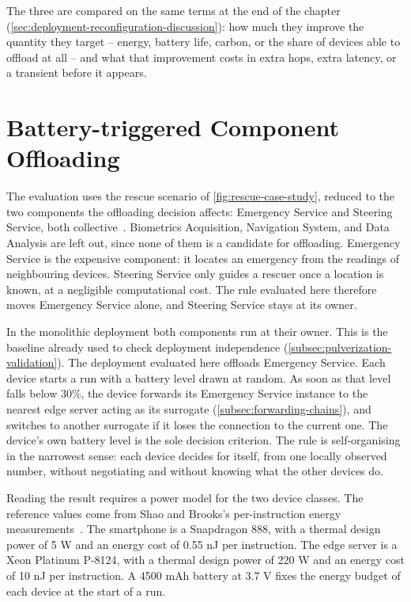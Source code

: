 The three are compared on the same terms at the end of the chapter (\cref{sec:deployment-reconfiguration-discussion}):
how much they improve the quantity they target -- energy, battery life, carbon, or the share of devices able to offload at all --
and what that improvement costs in extra hops, extra latency, or a transient before it appears.

\section{Battery-triggered Component Offloading}
\label{sec:battery-triggered-offloading}

The evaluation uses the rescue scenario of \cref{fig:rescue-case-study}, reduced to the two components the offloading decision affects:
Emergency Service and Steering Service, both collective~\cite{DBLP:conf/acsos/FarabegoliVC24}.
%
Biometrics Acquisition, Navigation System, and Data Analysis are left out, since none of them is a candidate for offloading.
%
Emergency Service is the expensive component: it locates an emergency from the readings of neighbouring devices.
Steering Service only guides a rescuer once a location is known, at a negligible computational cost.
%
The rule evaluated here therefore moves Emergency Service alone, and Steering Service stays at its owner.

In the monolithic deployment both components run at their owner.
This is the baseline already used to check deployment independence (\cref{subsec:pulverization-validation}).
%
The deployment evaluated here offloads Emergency Service.
%
Each device starts a run with a battery level drawn at random.
As soon as that level falls below 30\%, the device forwards its Emergency Service instance to the nearest edge server acting as its surrogate (\cref{subsec:forwarding-chains}),
and switches to another surrogate if it loses the connection to the current one.
%
The device's own battery level is the sole decision criterion.
%
The rule is self-organising in the narrowest sense:
each device decides for itself, from one locally observed number, without negotiating and without knowing what the other devices do.

Reading the result requires a power model for the two device classes.
%
The reference values come from Shao and Brooks's per-instruction energy measurements~\cite{DBLP:conf/islped/ShaoB13}.
%
The smartphone is a Snapdragon 888, with a thermal design power of 5 W and an energy cost of 0.55 nJ per instruction.
The edge server is a Xeon Platinum P-8124, with a thermal design power of 220 W and an energy cost of 10 nJ per instruction.
%
A 4500 mAh battery at 3.7 V fixes the energy budget of each device at the start of a run.


